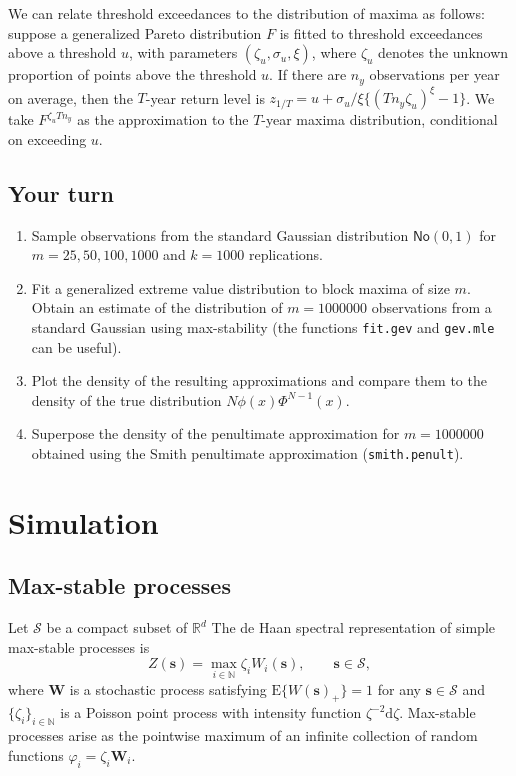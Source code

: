 \documentclass[]{book}
\providecommand{\tightlist}{%
  \setlength{\itemsep}{0pt}\setlength{\parskip}{0pt}}
\begin{document}
We can relate threshold exceedances to the distribution of maxima as follows: suppose a generalized Pareto distribution \(F\) is fitted to threshold exceedances above a threshold \(u\), with parameters \((\zeta_u, \sigma_u, \xi)\), where \(\zeta_u\) denotes the unknown proportion of points above the threshold \(u\). If there are \(n_y\) observations per year on average, then the \(T\)-year return level is \(z_{1/T}=u+\sigma_u/\xi\{(Tn_y\zeta_u)^\xi-1\}\). We take \(F^{\zeta_uTn_y}\) as the approximation to the \(T\)-year maxima distribution, conditional on exceeding \(u\).

\hypertarget{your-turn-2}{%
\section{Your turn}\label{your-turn-2}}

\begin{enumerate}
\def\labelenumi{\arabic{enumi}.}
\tightlist
\item
  Sample observations from the standard Gaussian distribution \(\mathsf{No}(0,1)\) for \(m = 25, 50, 100, 1000\) and \(k=1000\) replications.
\item
  Fit a generalized extreme value distribution to block maxima of size \(m\). Obtain an estimate of the distribution of \(m = 1000000\) observations from a standard Gaussian using max-stability (the functions \texttt{fit.gev} and \texttt{gev.mle} can be useful).
\item
  Plot the density of the resulting approximations and compare them to the density of the true distribution \(N\phi(x)\Phi^{N-1}(x)\).
\item
  Superpose the density of the penultimate approximation for \(m = 1000000\) obtained using the Smith penultimate approximation (\texttt{smith.penult}).
\end{enumerate}

\hypertarget{simulation}{%
\chapter{Simulation}\label{simulation}}

\hypertarget{max-stable-processes}{%
\section{Max-stable processes}\label{max-stable-processes}}

Let \(\mathcal{S}\) be a compact subset of \(\mathbb{R}^d\)
The de Haan spectral representation of simple max-stable processes is
\[Z(\boldsymbol{s}) = \max_{i \in \mathbb{N}} \zeta_i W_i(\boldsymbol{s}), \qquad \boldsymbol{s} \in \mathcal{S},\]
where \(\boldsymbol{W}\) is a stochastic process satisfying \(\mathrm{E}\{W(\boldsymbol{s})_{+}\}=1\) for any \(\boldsymbol{s} \in \mathcal{S}\) and \(\{\zeta_i\}_{i \in \mathbb{N}}\) is a Poisson point process with intensity function \(\zeta^{-2} \mathrm{d} \zeta\). Max-stable processes arise as the pointwise maximum of an infinite collection of random functions \(\varphi_i = \zeta_i \boldsymbol{W}_i\).
\end{document}
